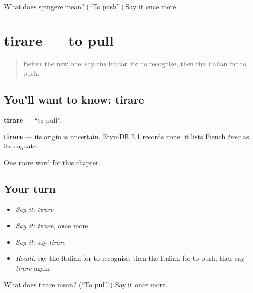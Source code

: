 \begin{tcolorbox}[breakable,colback=teal!4,colframe=teal!35!black,title={Before you move on}]
What does spingere mean? (\textquotedblleft{}To push\textquotedblright{}.) Say it once more.
\end{tcolorbox}
\section[tirare]{tirare — to pull}

\label{lesson:IT-C240-tirare}



\begin{quote}
Before the new one: say the Italian for to recognise, then the Italian for to push.
\end{quote}

\subsection*{You'll want to know: tirare}
\textbf{tirare} — \textquotedblleft{}to pull\textquotedblright{}.

\begin{cousinweb}
\textbf{tirare} — its origin is uncertain. EtymDB 2.1 records none; it lists French \emph{tirer} as its cognate.
\end{cousinweb}

\begin{grammarlens}[title={What you've built}]
One more word for this chapter.
\end{grammarlens}

\subsection*{Your turn}
\begin{itemize}
\raggedright
  \item \emph{Say it:} \emph{tirare}
  \item \emph{Say it:} \emph{tirare}, once more
  \item \emph{Say it:} say \emph{tirare}
  \item \emph{Recall:} say the Italian for to recognise, then the Italian for to push, then say \emph{tirare} again
\end{itemize}

\begin{tcolorbox}[breakable,colback=teal!4,colframe=teal!35!black,title={Before you move on}]
What does tirare mean? (\textquotedblleft{}To pull\textquotedblright{}.) Say it once more.
\end{tcolorbox}
